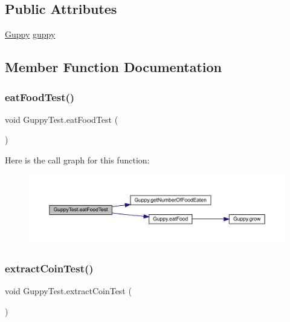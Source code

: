 \subsection*{Public Attributes}
\begin{DoxyCompactItemize}
\item 
\mbox{\hyperlink{class_guppy}{Guppy}} \mbox{\hyperlink{class_guppy_test_ad7ca1cfd1192cfc0875773b82df60bfb}{guppy}}
\end{DoxyCompactItemize}


\subsection{Member Function Documentation}
\mbox{\label{class_guppy_test_ac5810161de817b76932be0c2264a0980}} 
\subsubsection{\texorpdfstring{eat\+Food\+Test()}{eatFoodTest()}}
{\footnotesize\ttfamily void Guppy\+Test.\+eat\+Food\+Test (\begin{DoxyParamCaption}{ }\end{DoxyParamCaption})\hspace{0.3cm}{\ttfamily [inline]}}

Here is the call graph for this function\+:
\nopagebreak
\begin{figure}[H]
\begin{center}
\leavevmode
\includegraphics[width=350pt]{class_guppy_test_ac5810161de817b76932be0c2264a0980_cgraph}
\end{center}
\end{figure}
\mbox{\label{class_guppy_test_a1277dd581c572d4125b0599e144f726b}} 
\subsubsection{\texorpdfstring{extract\+Coin\+Test()}{extractCoinTest()}}
{\footnotesize\ttfamily void Guppy\+Test.\+extract\+Coin\+Test (\begin{DoxyParamCaption}{ }\end{DoxyParamCaption})\hspace{0.3cm}{\ttfamily [inline]}}

